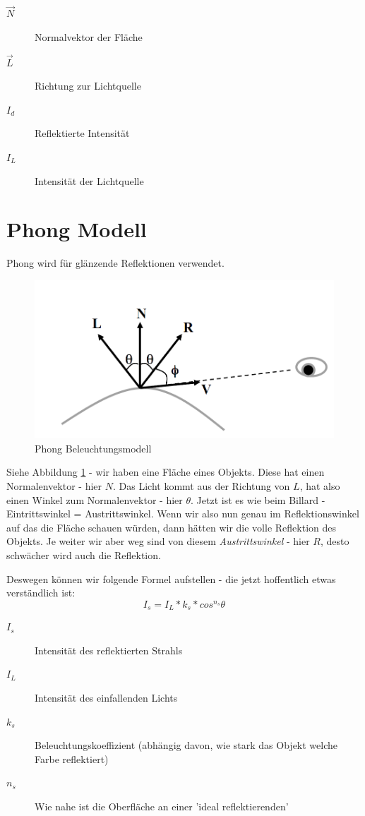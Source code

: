 \begin{description}
	\item[\(\vec{N}\)] Normalvektor der Fläche
	\item[\(\vec{L}\)] Richtung zur Lichtquelle
	\item[\(I_d\)] Reflektierte Intensität
	\item[\(I_L\)] Intensität der Lichtquelle
\end{description}

\section{Phong Modell}
Phong wird für glänzende Reflektionen verwendet. 
\begin{figure}[!ht]
	\centering
	\includegraphics[width=0.4\linewidth]{fig/phong}
	\caption{Phong Beleuchtungsmodell}
	\label{fig:phong}
\end{figure}
Siehe Abbildung \ref{fig:phong} - wir haben eine Fläche eines Objekts. Diese hat einen Normalenvektor - hier \(N\). Das Licht kommt aus der Richtung von \(L\), hat also einen Winkel zum Normalenvektor - hier \(\theta\). Jetzt ist es wie beim Billard - Eintrittswinkel = Austrittswinkel. Wenn wir also nun genau im Reflektionswinkel auf das die Fläche schauen würden, dann hätten wir die volle Reflektion des Objekts. Je weiter wir aber weg sind von diesem \textit{Austrittswinkel} - hier \(R\), desto schwächer wird auch die Reflektion. 

Deswegen können wir folgende Formel aufstellen - die jetzt hoffentlich etwas verständlich ist:
\begin{displaymath}
I_s = I_L*k_s*cos^{n_s}\theta
\end{displaymath}

\begin{description}
	\item[\(I_s\)] Intensität des reflektierten Strahls
	\item[\(I_L\)] Intensität des einfallenden Lichts
	\item[\(k_s\)] Beleuchtungskoeffizient (abhängig davon, wie stark das Objekt welche Farbe reflektiert)
	\item[\(n_s\)] Wie nahe ist die Oberfläche an einer 'ideal reflektierenden'
\end{description}

